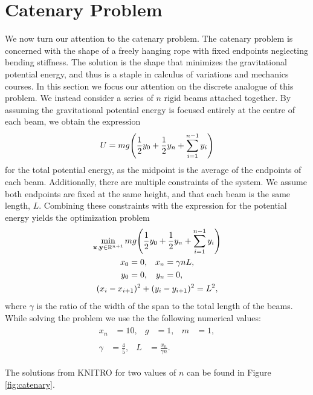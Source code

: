 \documentclass[11pt,a4paper,twocolumn]{article}
\let\originalleft\left
\let\originalright\right
\renewcommand{\left}{\mathopen{}\mathclose\bgroup\originalleft}
\renewcommand{\right}{\aftergroup\egroup\originalright}
\begin{document}
\section{Catenary Problem}
We now turn our attention to the catenary problem. The catenary problem is concerned with the shape of a freely hanging rope with fixed endpoints neglecting bending stiffness. The solution is the shape that minimizes the gravitational potential energy, and thus is a staple in calculus of variations and mechanics courses. In this section we focus our attention on the discrete analogue of this problem. We instead consider a series of $n$ rigid beams attached together. By assuming the gravitational potential energy is focused entirely at the centre of each beam, we obtain the expression
\begin{align}
	U = m g \left( \frac{1}{2} y_0 + \frac{1}{2} y_n + \sum_{i = 1}^{n-1} y_i \right)
\end{align}
for the total potential energy, as the midpoint is the average of the endpoints of each beam. Additionally, there are multiple constraints of the system. We assume both endpoints are fixed at the same height, and that each beam is the same length, $L$. Combining these constraints with the expression for the potential energy yields the optimization problem
\begin{gather}
	\min_{\mathbf{x}, \mathbf{y} \in \mathbb{R}^{n+1}} m g \left( \frac{1}{2} y_0 + \frac{1}{2} y_n + \sum_{i = 1}^{n-1} y_i \right) \\
	\begin{align}
		x_0 &= 0, & x_n &= \gamma n L, \nonumber \\
		y_0 &=0, & y_n &= 0,
	\end{align} \\
	(x_i - x_{i+1})^2 + (y_i - y_{i+1})^2 = L^2, \nonumber
\end{gather}
where $\gamma$ is the ratio of the width of the span to the total length of the beams. While solving the problem we use the the following numerical values:
\begin{gather}
	\begin{align}
		x_n &= 10, & g &= 1, & m &= 1,
	\end{align} \\
	\begin{align}
		\gamma &= \frac{4}{5}, & L &= \frac{x_n}{\gamma n}.
	\end{align}
\end{gather}

The solutions from KNITRO for two values of $n$ can be found in Figure \ref{fig:catenary}.
\end{document}
